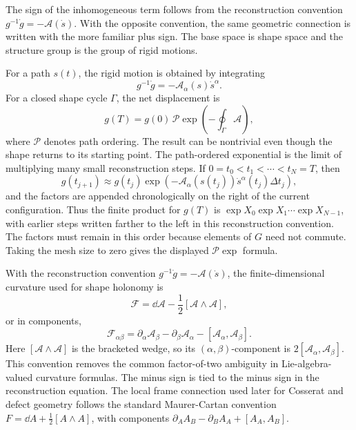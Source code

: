 The sign of the inhomogeneous term follows from the reconstruction convention
\(g^{-1}\dot g=-\mathcal A(\dot s)\). With the opposite convention, the same
geometric connection is written with the more familiar plus sign. The base space
is shape space and the structure group is the group of rigid motions.

For a path \(s(t)\), the rigid motion is obtained by integrating
\[
  g^{-1}\dot g=-\mathcal A_\alpha(s)\dot s^\alpha.
\]
For a closed shape cycle \(\Gamma\), the net displacement is
\[
  g(T)
  =
  g(0)\,
  \mathcal P\exp\left(
    -\oint_\Gamma \mathcal A
  \right),
\]
where \(\mathcal P\) denotes path ordering. The result can be nontrivial even
though the shape returns to its starting point.
The path-ordered exponential is the limit of multiplying many small
reconstruction steps. If \(0=t_0<t_1<\cdots<t_N=T\), then
\[
  g(t_{j+1})
  \approx
  g(t_j)\exp\left(-\mathcal A_{\alpha}(s(t_j))
  \dot s^\alpha(t_j)\Delta t_j\right),
\]
and the factors are appended chronologically on the right of the current
configuration. Thus the finite product for \(g(T)\) is
\(\exp X_0\exp X_1\cdots\exp X_{N-1}\), with earlier steps written farther to
the left in this reconstruction convention. The factors must remain in this
order because elements of \(G\) need not commute. Taking the mesh size to zero
gives the displayed \(\mathcal P\exp\) formula.

With the reconstruction convention \(g^{-1}\dot g=-\mathcal A(\dot s)\), the
finite-dimensional curvature used for shape holonomy is
\[
  \boxed{
  \mathcal F
  =
  \dd\mathcal A-\frac12[\mathcal A\wedge\mathcal A],
  }
\]
or in components,
\[
  \mathcal F_{\alpha\beta}
  =
  \partial_\alpha\mathcal A_\beta
  -
  \partial_\beta\mathcal A_\alpha
  -
  [\mathcal A_\alpha,\mathcal A_\beta].
\]
Here \([\mathcal A\wedge\mathcal A]\) is the bracketed wedge, so its
\((\alpha,\beta)\)-component is
\(2[\mathcal A_\alpha,\mathcal A_\beta]\). This convention removes the common
factor-of-two ambiguity in Lie-algebra-valued curvature formulas. The minus
sign is tied to the minus sign in the reconstruction equation. The local frame
connection used later for Cosserat and defect geometry follows the standard
Maurer-Cartan convention \(F=\dd A+\frac12[A\wedge A]\), with components
\(\partial_AA_B-\partial_BA_A+[A_A,A_B]\).

